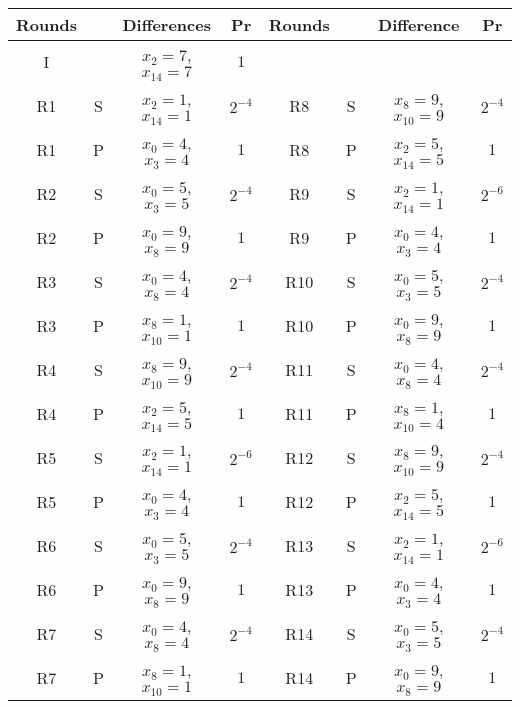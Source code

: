 \documentclass{llncs}
\begin{document}
\begin{center}
\begin{tabular}{|c|c|c|c||c|c|c|c|}
\hline
Rounds  & &  Differences  &  Pr & Rounds & & Difference & Pr\\
\hline
 I & & $x_2=7$,$x_{14}=7$ & $1$ & & & &\\
\hline

R1 &S& $x_2=1$,$x_{14}=1$ & $2^{-4}$ & R8 &S& $x_8=9$,$x_{10}=9$ & $2^{-4}$\\
R1 &P& $x_0=4$,$x_{3} =4$ & $1$      & R8 &P& $x_2=5$,$x_{14}=5$ & $1$\\

\hline

R2 &S& $x_0=5$,$x_{3}=5$ & $2^{-4}$ &  R9 &S& $x_2=1$,$x_{14}=1$ & $2^{-6}$\\
R2 &P& $x_0=9$,$x_{8}=9$ & $1$      &  R9 &P& $x_0=4$,$x_{3}=4 $ & $1$\\

\hline

R3 &S& $x_0=4$,$x_{8}=4 $& $2^{-4}$ & R10 &S& $x_0=5$,$x_{3}=5$ & $2^{-4}$\\
R3 &P& $x_8=1$,$x_{10}=1$& $1$      & R10 &P& $x_0=9$,$x_{8}=9 $& $1$\\

\hline

R4 &S& $x_8=9$,$x_{10}=9$& $2^{-4}$ & R11 &S& $x_0=4$, $x_{8} = 4 $& $2^{-4}$\\
R4 &P& $x_2=5$,$x_{14}=5$& $1$      & R11 &P& $x_8=1$, $x_{10}= 4 $& $1$\\

\hline

R5 &S& $x_2=1$,$x_{14}=1$& $2^{-6}$ &  R12 &S& $x_8=9$, $x_{10}= 9 $& $2^{-4}$\\
R5 &P& $x_0=4$,$x_{3}=4 $& $1$      &  R12 &P& $x_2=5$, $x_{14}= 5 $& $1$\\

\hline

R6 &S& $x_0=5$,$x_{3}=5$ & $2^{-4}$ &  R13 &S& $x_2=1$, $x_{14}= 1 $& $2^{-6}$\\
R6 &P& $x_0=9$,$x_{8}=9$ & $1$      &  R13 &P& $x_0=4$, $x_{3} = 4 $& $1$\\

\hline

R7 &S& $x_0=4$,$x_{8}=4  $& $2^{-4}$ & R14 &S& $x_0=5$, $x_{3}=5 $&$2^{-4}$\\
R7 &P& $x_8=1$,$x_{10}=1 $& $1$      & R14 &P& $x_0=9$, $x_{8}=9 $& $1$\\

\hline
\end{tabular}
\end{center}
\end{document}
